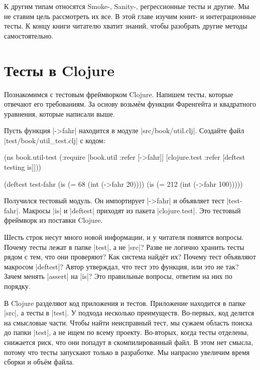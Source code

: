 К другим типам относятся Smoke-, Sanity-, регрессионные тесты и другие. Мы не
ставим цель рассмотреть их все. В этой главе изучим юнит- и интеграционные
тесты. К концу книги читателю хватит знаний, чтобы разобрать другие методы
самостоятельно.

\section{Тесты в Clojure}

Познакомимся с тестовым фреймворком Clojure. Напишем тесты, которые отвечают его
требованиям. За основу возьмём функции Фаренгейта и квадратного уравнения,
которые написали выше.

Пусть функция \spverb|->fahr| находится в модуле \spverb|src/book/util.clj|.
Создайте файл \spverb|test/book/util_test.clj| с кодом:


\begin{english}
  \begin{clojure}
(ns book.util-test
  (:require [book.util :refer [->fahr]]
            [clojure.test :refer [deftest testing is]]))

(deftest test-fahr
  (is (= 68 (int (->fahr 20))))
  (is (= 212 (int (->fahr 100)))))
  \end{clojure}
\end{english}

Получился тестовый модуль. Он импортирует \spverb|->fahr| и объявляет тест
\spverb|test-fahr|. Макросы \spverb|is| и \spverb|deftest| приходят из пакета
\spverb|clojure.test|. Это тестовый фреймворк из поставки Clojure.

Шесть строк несут много новой информации, и у читателя появятся вопросы. Почему
тесты лежат в папке \spverb|test|, а не \spverb|src|? Разве не логично хранить
тесты рядом с тем, что они проверяют? Как система найдёт их?  Почему тест
объявляют макросом \spverb|deftest|? Автор утверждал, что тест это функция, или
это не так? Зачем менять \spverb|assert| на \spverb|is|? Это правильные вопросы,
ответим на них по порядку.

В Clojure разделяют код приложения и тестов. Приложение находится в папке
\spverb|src|, а тесты в \spverb|test|. У подхода несколько
преимуществ. Во-первых, код делится на смысловые части. Чтобы найти неисправный
тест, мы сужаем область поиска до папки \spverb|test|, а не ищем по всему
проекту. Во-вторых, когда тесты отделены, снижается риск, что они попадут в
скомпилированный файл. В этом нет смысла, потому что тесты запускают только в
разработке. Мы напрасно увеличим время сборки и объём файла.

